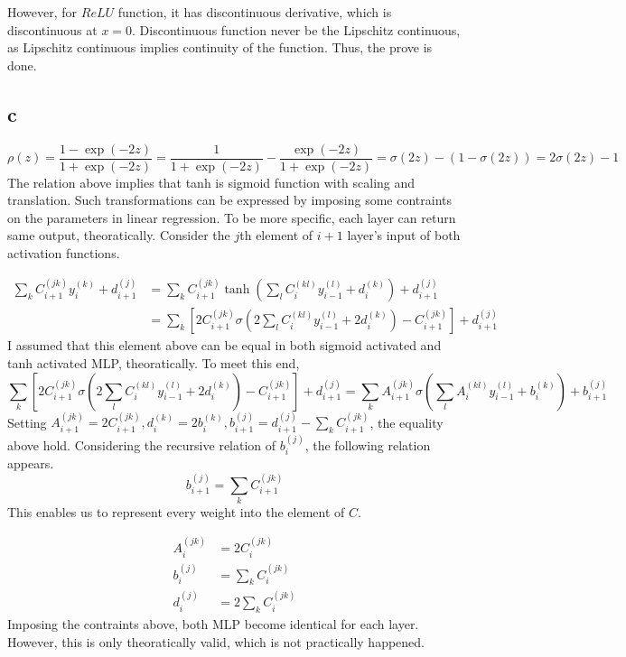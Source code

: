 \documentclass[10pt]{article}
\begin{document}
However, for $ReLU$ function, it has discontinuous derivative, which is discontinuous at $x = 0$. Discontinuous function never be the Lipschitz continuous, as Lipschitz continuous implies continuity of the function. Thus, the prove is done. 

\subsection*{c}
\begin{equation*}
    \rho(z) = \frac{1 - \exp{(-2z)}}{1+\exp{(-2z)}} = \frac{1}{1+\exp{(-2z)}} - \frac{\exp{(-2z)}}{1+\exp{(-2z)}} = \sigma(2z) - (1-\sigma(2z)) = 2\sigma(2z)-1
\end{equation*}
The relation above implies that tanh is sigmoid function with scaling and translation. Such transformations can be expressed by imposing some contraints on the parameters in linear regression.
To be more specific, each layer can return same output, theoratically. Consider the $j$th element of $i+1$ layer's input of both activation functions.

\begin{align*}
    \sum_k C_{i+1}^{(jk)}y_i^{(k)} + d_{i+1}^{(j)} &=\sum_k C_{i+1}^{(jk)}\tanh\left(\sum_lC_i^{(kl)}y_{i-1}^{(l)} + d_i^{(k)}\right) + d_{i+1}^{(j)}  \\
    &= \sum_k \left[ 2C_{i+1}^{(jk)}\sigma\left(2\sum_l C_i^{(kl)}y_{i-1}^{(l)} + 2d_i^{(k)}\right) - C_{i+1}^{(jk)}\right] + d_{i+1}^{(j)}
\end{align*}
I assumed that this element above can be equal in both sigmoid activated and tanh activated MLP, theoratically. To meet this end, 
\begin{equation*}
    \sum_k \left[ 2C_{i+1}^{(jk)}\sigma\left(2\sum_l C_i^{(kl)}y_{i-1}^{(l)} + 2d_i^{(k)}\right) - C_{i+1}^{(jk)}\right] + d_{i+1}^{(j)} = \sum_k A_{i+1}^{(jk)} \sigma\left(\sum_l A_i^{(kl)} y_{i-1}^{(l)} + b_i^{(k)}\right) + b_{i+1}^{(j)}
\end{equation*}
Setting $A_{i+1}^{(jk)} = 2C_{i+1}^{(jk)}, d_i^{(k)} = 2b_i^{(k)}, b_{i+1}^{(j)} = d_{i+1}^{(j)} - \sum_k C_{i+1}^{(jk)}$, the equality above hold. 
Considering the recursive relation of $b_i^{(j)}$, the following relation appears.
\begin{equation*}
    b_{i+1}^{(j)} = \sum_k C_{i+1}^{(jk)}
\end{equation*} 
This enables us to represent every weight into the element of $C$. 

\begin{align*}
    A_{i}^{(jk)} &= 2C_{i}^{(jk)} \\ b_{i}^{(j)} &= \sum_k C_{i}^{(jk)} \\ d_i^{(j)} &= 2\sum_k C_{i}^{(jk)}
\end{align*}
Imposing the contraints above, both MLP become identical for each layer. However, this is only theoratically valid, which is not practically happened.
\end{document}
